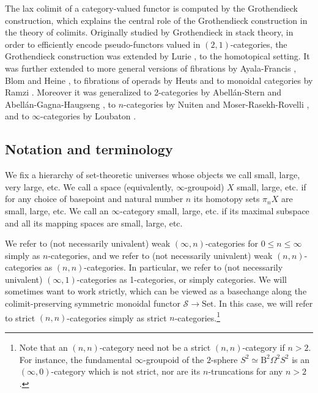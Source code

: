 \documentclass[10pt,oneside]{article}
\numberwithin{equation}{section} %
\numberwithin{figure}{section} %
\theoremstyle{plain}
\theoremstyle{definition}
\newcommand{\mS}{{\mathcal S}}
\newcommand{\n}{{n}}
\newcommand{\Set}{\mathrm{Set}}
\begin{document}
The lax colimit of a category-valued functor is computed by the Grothendieck construction, which explains the central role of the
Grothendieck construction in the theory of colimits.
Originally studied by Grothendieck in stack theory, in order to efficiently encode pseudo-functors valued in $(2,1)$-categories,
the Grothendieck construction was extended by Lurie \cite{lurie.HTT}, \cite{lurie2009infinity} to the homotopical setting.
It was further extended to more general versions of fibrations by Ayala-Francis \cite{MR4074276}, Blom \cite{blom2024straightening} and Heine \cite{heine2026local}, to fibrations of operads by Heuts \cite{heuts2011algebras} and to monoidal categories by Ramzi \cite{ramzi2026monoidal}.
Moreover it was generalized to 2-categories by Abell\'an-Stern \cite{abellan20262} and Abell\'an-Gagna-Haugseng \cite{abellan2025straightening}, to $n$-categories by Nuiten \cite{nuiten2023straightening} and Moser-Rasekh-Rovelli \cite{moser2023inftyncategoricalstraighteningunstraighteningconstruction}, and to $\infty$-categories by Loubaton \cite{loubaton2024categorical}.



\subsection{Notation and terminology}

We fix a hierarchy of set-theoretic universes whose objects we call small, large, very large, etc.
We call a space (equivalently, $\infty$-groupoid) $X$ small, large, etc. if for any choice of basepoint and natural number $n$ its homotopy sets $\pi_n X$ are small, large, etc.
We call an $\infty$-category small, large, etc. if its maximal subspace and all its mapping spaces are small, large, etc.

We refer to (not necessarily univalent) weak $(\infty,\n)$-categories for $0 \leq \n \leq \infty$ simply as $\n$-categories, and we refer to (not necessarily univalent) weak $(\n,\n)$-categories as $(\n,\n)$-categories.
In particular, we refer to (not necessarily univalent) $(\infty,1)$-categories as 1-categories, or simply categories.
We will sometimes want to work strictly, which can be viewed as a basechange along the colimit-preserving symmetric monoidal functor $\mS\to\Set$.
In this case, we will refer to strict $(\n,\n)$-categories simply as strict $\n$-categories.\footnote{Note that an $(n,n)$-category need not be a strict $(n,n)$-category if $n>2$.
For instance, the fundamental $\infty$-groupoid of the $2$-sphere $S^2\simeq \mathrm{B}^2\Omega^2 S^2$ is an $(\infty,0)$-category which is not strict, nor are its $n$-truncations for any $n>2$.}
\end{document}
